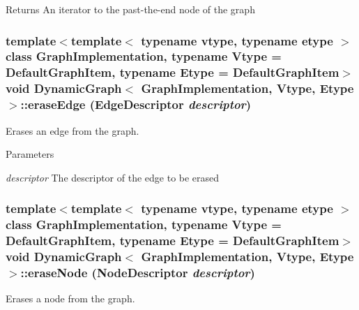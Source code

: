 \begin{DoxyReturn}{Returns}
An iterator to the past-\/the-\/end node of the graph 
\end{DoxyReturn}
\hypertarget{class_dynamic_graph_af648cec2163d1f7c5e8da88bf389eb02}{
\subsubsection[{eraseEdge}]{\setlength{\rightskip}{0pt plus 5cm}template$<$template$<$ typename vtype, typename etype $>$ class GraphImplementation, typename Vtype  = DefaultGraphItem, typename Etype  = DefaultGraphItem$>$ void {\bf DynamicGraph}$<$ GraphImplementation, Vtype, Etype $>$::eraseEdge (EdgeDescriptor {\em descriptor})}}
\label{class_dynamic_graph_af648cec2163d1f7c5e8da88bf389eb02}


Erases an edge from the graph. 


\begin{DoxyParams}{Parameters}
\item[{\em descriptor}]The descriptor of the edge to be erased \end{DoxyParams}
\hypertarget{class_dynamic_graph_aaf6cb65860223b369ca8a07fb59806cc}{
\subsubsection[{eraseNode}]{\setlength{\rightskip}{0pt plus 5cm}template$<$template$<$ typename vtype, typename etype $>$ class GraphImplementation, typename Vtype  = DefaultGraphItem, typename Etype  = DefaultGraphItem$>$ void {\bf DynamicGraph}$<$ GraphImplementation, Vtype, Etype $>$::eraseNode (NodeDescriptor {\em descriptor})}}
\label{class_dynamic_graph_aaf6cb65860223b369ca8a07fb59806cc}


Erases a node from the graph. 


